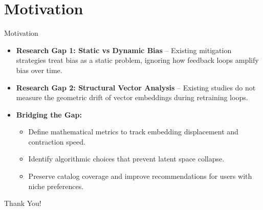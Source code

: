\documentclass[11pt,aspectratio=43]{beamer}
\newcommand{\strong}[1]{\textbf{#1}}
\begin{document}
\section{Motivation}
\begin{frame}{Motivation}
  \begin{itemize}
    \item \strong{Research Gap 1: Static vs Dynamic Bias} -- Existing mitigation strategies treat bias as a static problem, ignoring how feedback loops amplify bias over time.
    
    \item \strong{Research Gap 2: Structural Vector Analysis} -- Existing studies do not measure the geometric drift of vector embeddings during retraining loops.
    
    \item \strong{Bridging the Gap:}
      \begin{itemize}
        \item Define mathematical metrics to track embedding displacement and contraction speed.
        \item Identify algorithmic choices that prevent latent space collapse.
        \item Preserve catalog coverage and improve recommendations for users with niche preferences.
      \end{itemize}
  \end{itemize}
\end{frame}

\begin{frame}
  \centering
  \LARGE Thank You!
\end{frame}
\end{document}
